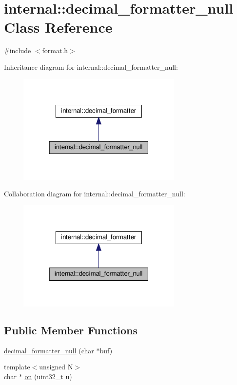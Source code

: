 \hypertarget{classinternal_1_1decimal__formatter__null}{}\section{internal\+:\+:decimal\+\_\+formatter\+\_\+null Class Reference}
\label{classinternal_1_1decimal__formatter__null}


{\ttfamily \#include $<$format.\+h$>$}



Inheritance diagram for internal\+:\+:decimal\+\_\+formatter\+\_\+null\+:
\nopagebreak
\begin{figure}[H]
\begin{center}
\leavevmode
\includegraphics[width=232pt]{classinternal_1_1decimal__formatter__null__inherit__graph}
\end{center}
\end{figure}


Collaboration diagram for internal\+:\+:decimal\+\_\+formatter\+\_\+null\+:
\nopagebreak
\begin{figure}[H]
\begin{center}
\leavevmode
\includegraphics[width=232pt]{classinternal_1_1decimal__formatter__null__coll__graph}
\end{center}
\end{figure}
\subsection*{Public Member Functions}
\begin{DoxyCompactItemize}
\item 
\hyperlink{classinternal_1_1decimal__formatter__null_a32c89caada7aae35e01ac879a0c4b951}{decimal\+\_\+formatter\+\_\+null} (char $\ast$buf)
\item 
{\footnotesize template$<$unsigned N$>$ }\\char $\ast$ \hyperlink{classinternal_1_1decimal__formatter__null_ad80412ef085aa07ed5619f4b731c290f}{on} (uint32\+\_\+t u)
\end{DoxyCompactItemize}


